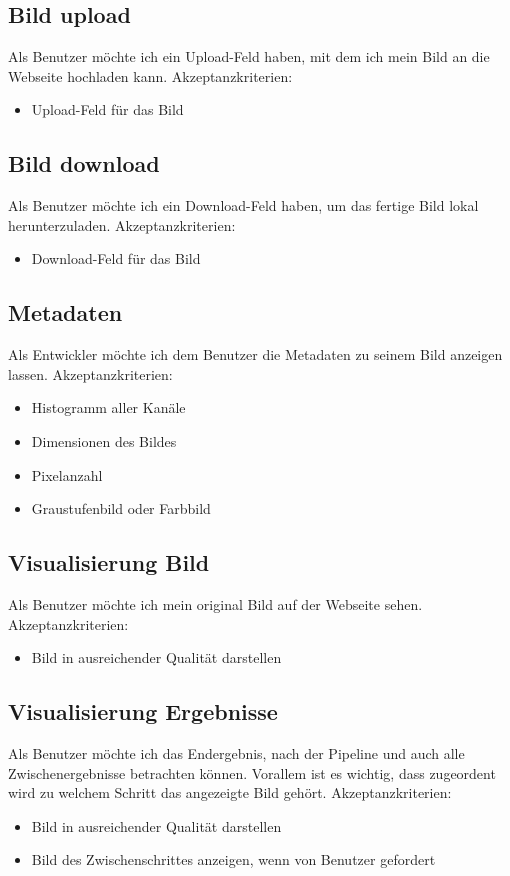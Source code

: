 \documentclass[conference]{IEEEtran}
\begin{document}
\subsection{Bild upload}
Als Benutzer möchte ich ein Upload-Feld haben, mit dem ich mein Bild an die Webseite hochladen kann.
Akzeptanzkriterien: 
\begin{itemize}
	\item Upload-Feld für das Bild
\end{itemize}

\subsection{Bild download}
Als Benutzer möchte ich ein Download-Feld haben, um das fertige Bild lokal herunterzuladen.
Akzeptanzkriterien: 
\begin{itemize}
	\item Download-Feld für das Bild
\end{itemize}

\subsection{Metadaten}
Als Entwickler möchte ich dem Benutzer die Metadaten zu seinem Bild anzeigen lassen.
Akzeptanzkriterien: 
\begin{itemize}
	\item Histogramm aller Kanäle
	\item Dimensionen des Bildes
	\item Pixelanzahl
	\item Graustufenbild oder Farbbild
\end{itemize}

\subsection{Visualisierung Bild}
Als Benutzer möchte ich mein original Bild auf der Webseite sehen.
Akzeptanzkriterien: 
\begin{itemize}
	\item Bild in ausreichender Qualität darstellen
\end{itemize}

\subsection{Visualisierung Ergebnisse}
Als Benutzer möchte ich das Endergebnis, nach der Pipeline und auch alle Zwischenergebnisse betrachten können. Vorallem ist es wichtig, dass zugeordent wird zu welchem Schritt das angezeigte Bild gehört.
Akzeptanzkriterien: 
\begin{itemize}
	\item Bild in ausreichender Qualität darstellen
	\item Bild des Zwischenschrittes anzeigen, wenn von Benutzer gefordert
\end{itemize}
\end{document}
